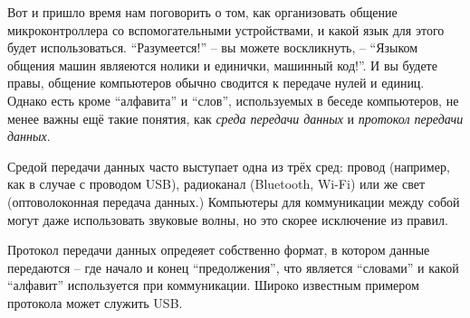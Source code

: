 \documentclass[../sparc.tex]{subfiles}
\begin{document}
Вот и пришло время нам поговорить о том, как организовать общение
микроконтроллера со вспомогательными устройствами, и какой язык для этого будет
использоваться.  ``Разумеется!'' -- вы можете воскликнуть, -- ``Языком общения
машин являеются нолики и единички, машинный код!''.  И вы будете правы, общение
компьютеров обычно сводится к передаче нулей и единиц.  Однако есть кроме
``алфавита'' и ``слов'', используемых в беседе компьютеров, не менее важны ещё
такие понятия, как \emph{среда передачи данных} и \emph{протокол передачи
данных}.

Средой передачи данных часто выступает одна из трёх сред: провод (например, как
в случае с проводом USB), радиоканал (Bluetooth, Wi-Fi) или же свет
(оптоволоконная передача данных.)  Компьютеры для коммуникации между собой могут
даже использовать звуковые волны, но это скорее исключение из правил.

Протокол передачи данных опредеяет собственно формат, в котором данные
передаются -- где начало и конец ``предолжения'', что является ``словами'' и
какой ``алфавит'' используется при коммуникации.  Широко известным примером
протокола может служить USB.
\end{document}
